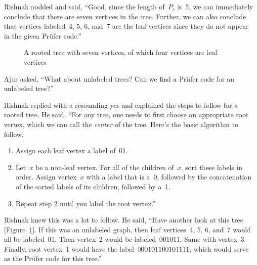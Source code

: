 Rishnak nodded and said, ``Good, since the length of~$P_c$ is~5, we can immediately conclude that there are seven vertices in the tree. Further, we can also conclude that vertices labeled~4, 5, 6, and~7 are the leaf vertices since they do not appear in the given Pr\"ufer code.''

\begin{figure}
\begin{center}


\caption{A rooted tree with seven vertices, of which four vertices are leaf vertices}\label{8g5}
\end{center}
\end{figure}

Ajur asked, ``What about unlabeled trees? Can we find a Pr\"ufer code for an unlabeled tree?''

Rishnak replied with a resounding yes and explained the steps to follow for a rooted tree. He said, ``For any tree, one needs to first choose an appropriate root vertex, which we can call the \textit{center} of the tree. Here's the basic algorithm to follow.
\begin{enumerate}
    \item Assign each leaf vertex a label of~01.
    \item Let~$x$ be a non-leaf vertex. For all of the children of~$x$, sort these labels in order. Assign vertex~$x$ with a label that is a~0, followed by the concatenation of the sorted labels of its children, followed by a~1.
    \item Repeat step 2 until you label the root vertex.''
\end{enumerate}

Rishnak knew this was a lot to follow. He said, ``Have another look at this tree [Figure~\ref{8g5}]. If this was an unlabeled graph, then leaf vertices~4, 5, 6, and~7 would all be labeled~01. Then vertex~2 would be labeled~$001011$. Same with vertex~3. Finally, root vertex~1 would have the label~$000101100101111$, which would serve as the Pr\"ufer code for this tree.''

